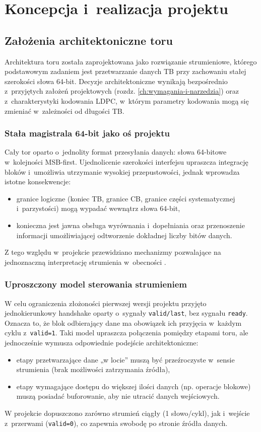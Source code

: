 \chapter{Koncepcja i~realizacja projektu}
\label{ch:koncepcja_i_realizacja}

\section{Założenia architektoniczne toru}
\label{sec:arch_zalozenia}

Architektura toru została zaprojektowana jako rozwiązanie strumieniowe, którego podstawowym zadaniem jest przetwarzanie danych TB przy zachowaniu stałej szerokości słowa 64-bit. Decyzje architektoniczne wynikają bezpośrednio z~przyjętych założeń projektowych (rozdz. \ref{ch:wymagania-i-narzedzia}) oraz z~charakterystyki kodowania LDPC, w~którym parametry kodowania mogą się zmieniać w~zależności od długości TB.

\subsection{Stała magistrala 64-bit jako oś projektu}
Cały tor oparto o~jednolity format przesyłania danych: słowa 64-bitowe w~kolejności MSB-first. Ujednolicenie szerokości interfejsu upraszcza integrację bloków i~umożliwia utrzymanie wysokiej przepustowości, jednak wprowadza istotne konsekwencje:
\begin{itemize}
    \item granice logiczne (koniec TB, granice CB, granice części systematycznej i~parzystości) mogą wypadać wewnątrz słowa 64-bit,
    \item konieczna jest jawna obsługa wyrównania i~dopełniania oraz przenoszenie informacji umożliwiającej odtworzenie dokładnej liczby bitów danych.
\end{itemize}
Z tego względu w~projekcie przewidziano mechanizmy pozwalające na jednoznaczną interpretację strumienia w~obecności .

\subsection{Uproszczony model sterowania strumieniem}
W celu ograniczenia złożoności pierwszej wersji projektu przyjęto jednokierunkowy handshake oparty o~sygnały \texttt{valid/last}, bez sygnału \texttt{ready}. Oznacza to, że blok odbierający dane ma obowiązek ich przyjęcia w~każdym cyklu z~\texttt{valid=1}. Taki model upraszcza połączenia pomiędzy etapami toru, ale jednocześnie wymusza odpowiednie podejście architektoniczne:
\begin{itemize}
    \item etapy przetwarzające dane „w locie” muszą być przeźroczyste w~sensie strumienia (brak możliwości zatrzymania źródła),
    \item etapy wymagające dostępu do większej ilości danych (np. operacje blokowe) muszą posiadać buforowanie, aby nie utracić danych wejściowych.
\end{itemize}
W projekcie dopuszczono zarówno strumień ciągły (1 słowo/cykl), jak i~wejście z~przerwami (\texttt{valid=0}), co zapewnia swobodę po stronie źródła danych.

